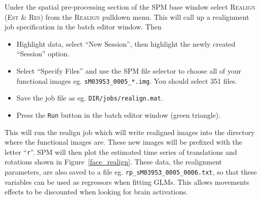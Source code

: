 Under the spatial pre-processing section of the SPM base window select \textsc{Realign (Est \& Res)} from the \textsc{Realign} pulldown menu. This will call up a realignment job specification in the batch editor window.
Then
\begin{itemize}
\item Highlight data, select ``New Session'', then highlight the newly created ``Session'' option.
\item Select ``Specify Files'' and use the SPM file selector to choose all of your functional images eg. \texttt{sM03953\_0005\_*.img}. You should select 351 files.
\item Save the job file as eg. \texttt{DIR/jobs/realign.mat}.
\item Press the \texttt{Run} button in the batch editor window (green triangle).
\end{itemize}
This will run the realign job which will write realigned images into the directory where the functional images are. These new images will be prefixed with the letter ``\texttt{r}''. SPM will then plot the estimated time series of translations and rotations shown in Figure~\ref{face_realign}. These data, the realignment parameters, are also saved to a file eg. \texttt{rp\_sM03953\_0005\_0006.txt}, so that these variables can be used as regressors when fitting GLMs. This allows movements effects to be discounted when looking for brain activations.

